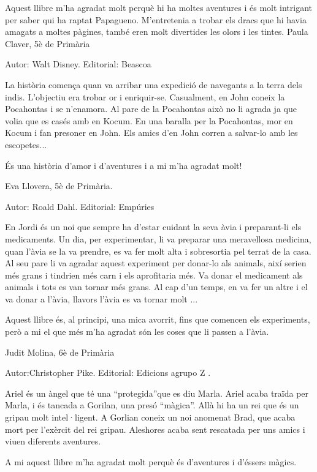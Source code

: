 \begin{shortnews}
{Aquest  llibre m’ha agradat molt perquè hi ha moltes aventures i és molt intrigant per saber qui ha raptat Papagueno. M’entretenia a trobar els dracs que hi havia amagats a moltes pàgines, també eren molt divertides les olors i les tintes.  
Paula Claver, 5è de Primària
}

{
Autor: Walt Disney.   Editorial: Beascoa

La història comença quan va arribar una expedició de navegants a la terra dels indis.
L’objectiu era trobar or i enriquir-se. Casualment, en John coneix la Pocahontas i se n’enamora. Al pare de la Pocahontas  això no li agrada ja que volia que es casés amb en Kocum. En una baralla per la Pocahontas, mor en Kocum i fan presoner en John. Els amics d’en John corren a salvar-lo amb les escopetes...

És una història d’amor i d’aventures i a mi m’ha agradat molt!

Eva Llovera, 5è de Primària.
}


{
Autor: Roald Dahl.   Editorial: Empúries

En Jordi és un noi que  sempre ha d’estar cuidant la seva àvia i preparant-li els medicaments. Un dia, per experimentar,  li va preparar  una meravellosa medicina, quan l’àvia se la va prendre, es va fer molt alta i sobresortia pel terrat de la casa. Al seu pare li va agradar aquest experiment per donar-lo als animals, així serien més grans i tindrien més carn i els aprofitaria més. Va donar el medicament als animals i tots es van tornar  més grans. Al cap d’un temps, en va fer un altre i el va donar a l’àvia, llavors l’àvia es va tornar molt ...  

Aquest llibre és, al principi, una mica avorrit, fins que  comencen els experiments, però a mi el que més m’ha agradat són les coses que li passen a l’àvia.

Judit Molina, 6è de Primària
}

{
Autor:Christopher Pike. Editorial: Edicions  agrupo  Z .

Ariel és un àngel que té una “protegida”que es diu Marla. Ariel acaba traïda per Marla, i és tancada a Gorilan, una presó “màgica”. Allà hi ha un rei que és un gripau molt intel·ligent. A Gorlian coneix un noi anomenat Brad, que acaba mort per l’exèrcit del rei gripau. Aleshores acaba sent rescatada per uns amics i viuen diferents aventures.

A mi aquest llibre m’ha agradat molt perquè és d’aventures i d’éssers màgics.

}
\end{shortnews}
